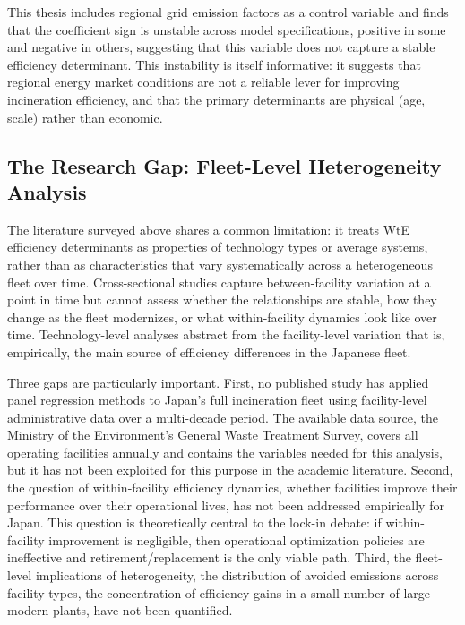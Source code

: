 \documentclass[12pt,a4paper]{article}
\begin{document}
This thesis includes regional grid emission factors as a control variable and finds that the coefficient sign is unstable across model specifications, positive in some and negative in others, suggesting that this variable does not capture a stable efficiency determinant. This instability is itself informative: it suggests that regional energy market conditions are not a reliable lever for improving incineration efficiency, and that the primary determinants are physical (age, scale) rather than economic.

\subsection{The Research Gap: Fleet-Level Heterogeneity Analysis}

The literature surveyed above shares a common limitation: it treats WtE efficiency determinants as properties of technology types or average systems, rather than as characteristics that vary systematically across a heterogeneous fleet over time. Cross-sectional studies capture between-facility variation at a point in time but cannot assess whether the relationships are stable, how they change as the fleet modernizes, or what within-facility dynamics look like over time. Technology-level analyses abstract from the facility-level variation that is, empirically, the main source of efficiency differences in the Japanese fleet.

Three gaps are particularly important. First, no published study has applied panel regression methods to Japan's full incineration fleet using facility-level administrative data over a multi-decade period. The available data source, the Ministry of the Environment's General Waste Treatment Survey, covers all operating facilities annually and contains the variables needed for this analysis, but it has not been exploited for this purpose in the academic literature. Second, the question of within-facility efficiency dynamics, whether facilities improve their performance over their operational lives, has not been addressed empirically for Japan. This question is theoretically central to the lock-in debate: if within-facility improvement is negligible, then operational optimization policies are ineffective and retirement/replacement is the only viable path. Third, the fleet-level implications of heterogeneity, the distribution of avoided emissions across facility types, the concentration of efficiency gains in a small number of large modern plants, have not been quantified.
\end{document}
